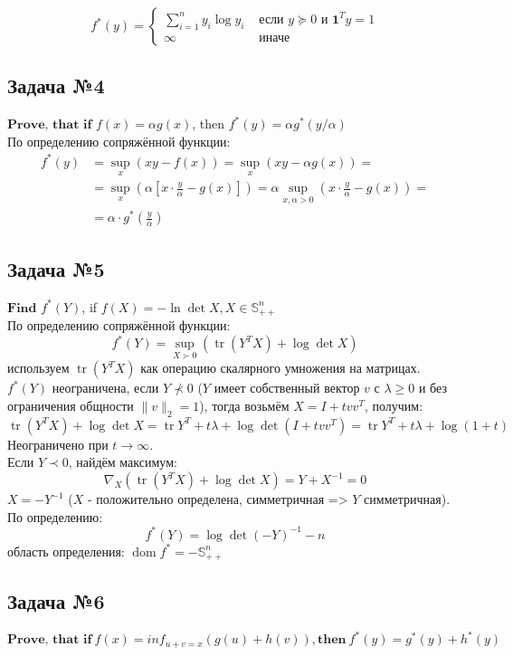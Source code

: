 \documentclass[12pt,letterpaper]{article}
\begin{document}
$$
f^{*}(y)=\left\{\begin{array}{ll}
\sum_{i=1}^{n} y_{i} \log y_{i} & \text { если } y \succeq 0 \text { и } \mathbf{1}^{T} y=1 \\
\infty & \text { иначе }
\end{array}\right.
$$

\subsection*{Задача №4}
$\textbf{Prove, that if}$ $f(x) = \alpha g(x)$, then $f^*(y) = \alpha g^*(y/\alpha)$\\

По определению сопряжённой функции: 
$$
\begin{aligned}
f^{*}(y) &=\sup _{x} (x y-f(x))=\sup _{x}(x y-\alpha g(x))=\\
&=\sup _{x} \left(\alpha\left[x \cdot \frac{y}{\alpha}-g(x)\right]\right)=\alpha \sup _{x, \alpha>0} \left(x \cdot \frac{y}{\alpha}-g(x)\right) =\\
&= \alpha \cdot g^* \left( \frac{y}{\alpha} \right)
\end{aligned}
$$

\subsection*{Задача №5}
$\textbf{Find}$ $f^*(Y)$, if $f(X) = - \ln \det X, X \in \mathbb{S}^n_{++}$\\
По определению сопряжённой функции: 
$$
f^{*}(Y)=\sup _{X \succ 0}(\operatorname{tr}(Y^T X)+\log \operatorname{det} X)
$$
используем $ \operatorname{tr}(Y^T X) $ как операцию скалярного умножения на матрицах. $ f^{*}(Y) $ неограничена, если $ Y \nprec 0 $ ($ Y $ имеет собственный вектор $ v $ с $ \lambda \geq  0 $ и без ограничения общности $ \|v\|_{2}=1 $), тогда возьмём $ X=I+t v v^{T} $, получим: 
$$
\operatorname{tr}(Y^T X)+\log \operatorname{det} X=\operatorname{tr} Y^T+t \lambda+\log \operatorname{det}\left(I+t v v^{T}\right)=\operatorname{tr} Y^T+t \lambda+\log (1+t)
$$
Неограничено при $ t \rightarrow \infty $.\\
Если $ Y \prec 0 $, найдём максимум:
$$
\nabla_{X}(\operatorname{tr}(Y^T X)+\log \operatorname{det} X)=Y+X^{-1}=0
$$
$ X = -Y^{-1} $ ($ X $ - положительно определена, симметричная => $ Y $ симметричная). По определению:
$$
f^{*}(Y)=\log \operatorname{det}(-Y)^{-1}-n
$$
область определения: $ \operatorname{dom} f^{*}=-\mathbb{S}_{++}^{n} $

\subsection*{Задача №6}
$\textbf{Prove, that if}\ f(x) = inf_{u+v=x}(g(u)+h(v)), \textbf{then}\ f^*(y)=g^*(y)+h^*(y)$
\end{document}
